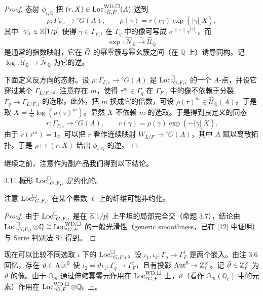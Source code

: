 \begin{proof}
态射 $\phi_{\iota,\mathbb Q}$ 把 $(r,X)\in\operatorname{Loc}^{\mathrm{WD},\square}_{{}^cG,F}(A)$ 送到
\[
\rho:\Gamma_{F,\iota}\to{}^cG(A),\qquad \rho(\gamma)=r(\iota\gamma)\exp(|\gamma|_\iota X),
\]
其中 $|\gamma|_\iota\in\mathbb{Z}[1/p]$ 使得 $\gamma\in\Gamma_{F,\iota}$ 在 $\Gamma_q$ 中的像可写成 $\sigma^{\|\gamma\|}\tau^{|\gamma|_\iota}$，而
\[
\exp:\hat{\mathcal N}_{\mathbb Q}\xrightarrow{\ \sim\ }\hat{\mathcal U}_{\mathbb Q}
\]
是通常的指数映射，它在 $\widehat{G}$ 的幂零簇与幂幺簇之间（在 $\mathbb Q$ 上）诱导同构。记 $\log:\hat{\mathcal U}_{\mathbb Q}\to\hat{\mathcal N}_{\mathbb Q}$ 为它的逆。

下面定义反方向的态射。设 $\rho:\Gamma_{F,\iota}\to{}^cG(A)$ 是 $\operatorname{Loc}^{\square}_{{}^cG,F,\iota}$ 的一个 $A$-点，并设它穿过某个 $\Gamma_{L/F,\iota}$。注意存在 $m$，使得 $\tau^m\in\Gamma_q$ 在 $\Gamma_{F,\iota}$ 中的像不依赖于分裂 $\Gamma_q\to\Gamma_{L/F,\iota}$ 的选取。此外，把 $m$ 换成它的倍数，可设 $\rho(\tau)^m\in\hat{\mathcal U}_{\mathbb Q}(A)$。于是取 $X=\frac1m\log(\rho(\tau)^m)$。显然 $X$ 不依赖 $m$ 的选取。于是得到良定义的同态
\[
r:\Gamma_{F,\iota}\to{}^cG(A),\qquad r(\gamma)=\rho(\gamma)\exp(-|\gamma|_\iota X).
\]
由于 $r(\tau^m)=1$，可以把 $r$ 看作连续映射 $W_{L/F}\to{}^cG(A)$，其中 $A$ 赋以离散拓扑。于是 $\rho\mapsto(r,X)$ 给出 $\phi_{\iota,\mathbb Q}$ 的逆。
\end{proof}

继续之前，注意作为副产品我们得到以下结论。

\begin{cor}{3.11}
概形 $\operatorname{Loc}^{\square}_{{}^cG,F,\iota}$ 是约化的。
\end{cor}

注意 $\operatorname{Loc}^{\square}_{{}^cG,F,\iota}$ 在某个素数 $\ell$ 上的纤维可能非约化。

\begin{proof}
由于 $\operatorname{Loc}^{\square}_{{}^cG,F,\iota}$ 是在 $\mathbb{Z}[1/p]$ 上平坦的局部完全交（命题 3.7），结论由 $\operatorname{Loc}^{\square}_{{}^cG,F,\iota}\otimes\mathbb Q\cong\operatorname{Loc}^{\mathrm{WD},\square}_{{}^cG,F}$ 的一般光滑性（generic smoothness，已在 [12] 中证明）与 Serre 判别法 S1 得到。
\end{proof}

现在可以比较不同选取 $\iota$ 下的 $\operatorname{Loc}^{\square}_{{}^cG,F,\iota}$。设 $\iota_1,\iota_2:\Gamma_q\to\Gamma^t_F$ 是两个嵌入。由注 3.6 回忆，存在 $\vartheta\in\operatorname{Aut}^0$ 使 $\iota_2=\vartheta\iota_1:\Gamma_q\to\Gamma^t_F$，且有投影 $\operatorname{Aut}^0\to\mathbb{Z}_\ell^\times$。记 $\bar\vartheta\in\mathbb{Z}_\ell^\times$ 为 $\vartheta$ 的像。由于 $\mathbb G_m$ 通过伸缩幂零元作用在 $\operatorname{Loc}^{\mathrm{WD},\square}_{{}^cG,F}$ 上，$\bar\vartheta$（看作 $\mathbb G_m(\mathbb Q_\ell)$ 中的元素）作用在 $\operatorname{Loc}^{\mathrm{WD},\square}_{{}^cG,F}\otimes\mathbb Q_\ell$ 上。

